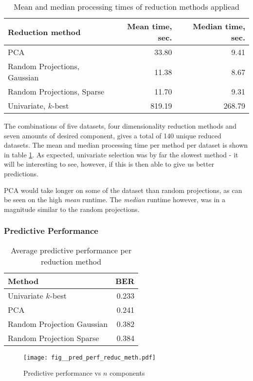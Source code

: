\documentclass[12pt]{article}
\begin{document}
\begin{table}[h]
\centering
\begin{tabular}{lrr}
\toprule
Reduction method				& Mean time, sec. 		&  Median time, sec. \\
\midrule
PCA 							& 33.80 				&  9.41 \\
Random Projections, Gaussian	& 11.38 				&  8.67 \\
Random Projections, Sparse		& 11.70 				&  9.31 \\
Univariate, $k$-best			&  819.19 			&  268.79 \\
\bottomrule
\end{tabular}
\caption{\label{tab:reducetimes} Mean and median processing times of reduction methods appliead}
\end{table}

The combinations of five datasets, four dimensionality reduction methods and seven amounts of desired component, gives a total of 140 unique reduced datasets. The mean and median processing time per method per dataset is shown in table \ref{tab:reducetimes}. As expected, univariate selection was by far the slowest method - it will be interesting to see, however, if this is then able to give us better predictions.

PCA would take longer on some of the dataset than random projections, as can be seen on the high \emph{mean} runtime. The \emph{median} runtime however, was in a magnitude similar to the random projections.


\subsubsection{Predictive Performance}

\begin{table}[t!]
\centering
\begin{tabular}{lr}
\toprule
Method 	&       BER \\
\midrule
Univariate $k$-best      		&  0.233 \\
PCA						&  0.241 \\
Random Projection Gaussian	&  0.382 \\
Random Projection Sparse	&  0.384 \\
\bottomrule
\end{tabular}
\caption{\label{tab:reduceperf} Average predictive performance per reduction method}
\end{table}

\begin{figure}[b!]
  \begin{center}
    \texttt{[image: fig\_\_pred\_perf\_reduc\_meth.pdf]}
    \caption{\label{fig:pred_perf_reduc_meth} Predictive performance vs $n$ components}
  \end{center}
\end{figure}
\end{document}
